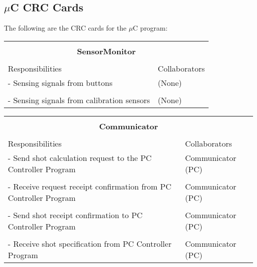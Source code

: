 \documentclass[titlepage]{article}
\begin{document}
\subsection{$\mu$C CRC Cards}
The following are the CRC cards for the $\mu$C program:\\
\begin{table}[!htbp]
\centering
\begin{tabular}{| p{} | p{} |}\hline
	\multicolumn{2}{|l|}{}\\
	\multicolumn{2}{|c|}{\large{\textbf{SensorMonitor}}}\\
	\multicolumn{2}{|l|}{}\\\hline
	\vspace{0mm}\large{Responsibilities}\vspace{2mm} &\vspace{0mm}\large{Collaborators}\vspace{2mm}\\\hline
	\vspace{0mm}- Sensing signals from buttons	&\vspace{0mm}(None)\\&\\
	- Sensing signals from calibration sensors\vspace{2mm}	&(None)\vspace{2mm}\\\hline
\end{tabular}
\end{table}

\begin{table}[!htbp]
\centering
\begin{tabular}{| p{} | p{} |}\hline
	\multicolumn{2}{|l|}{}\\
	\multicolumn{2}{|c|}{\large{\textbf{Communicator}}}\\
	\multicolumn{2}{|l|}{}\\\hline
	\vspace{0mm}\large{Responsibilities}\vspace{2mm} &\vspace{0mm}\large{Collaborators}\vspace{2mm}\\\hline
	\vspace{0mm}- Send shot calculation request to the PC Controller Program	&\vspace{0mm}Communicator (PC)\\&\\
	- Receive request receipt confirmation from PC Controller Program			&Communicator (PC)\\&\\
	- Send shot receipt confirmation to PC Controller Program					&Communicator (PC)\\&\\
	- Receive shot specification from PC Controller Program\vspace{2mm}			&Communicator (PC)\vspace{2mm}\\\hline
\end{tabular}
\end{table}
\end{document}
